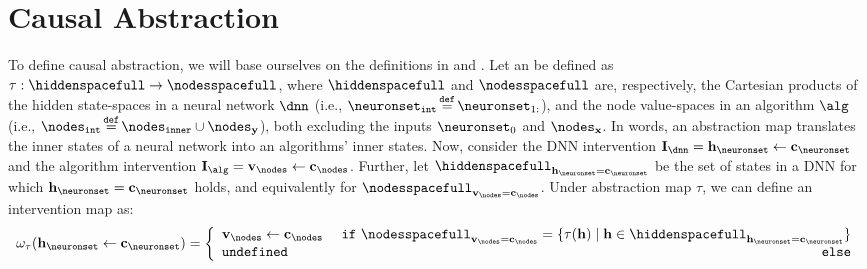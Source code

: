 \documentclass{article}
\newcommand{\bx}{\mathbf{x}}
\newcommand{\by}{\mathbf{y}}
\newcommand{\nodesvalues}{\mathbf{v}}
\newcommand{\nodesinput}{\nodes_{\bx}}
\newcommand{\nodesoutput}{\nodes_{\by}}
\newcommand{\nodesinner}{\nodes_{\mathtt{inner}}}
\newcommand{\hiddenstates}{\mathbf{h}}
\newcommand{\causalmap}{\phi}
\newcommand{\abstractionmap}{\tau}
\newcommand{\interventionmap}{\omega_{\abstractionmap}}
\begin{document}
\section{Causal Abstraction}
\label{sec:Causal_Abstraction}
\label{sec:causal_abstraction}

\newcommand{\nodesint}{\nodes_{\mathtt{int}}}
\newcommand{\neuronsetint}{\neuronset_{\mathtt{int}}}
\newcommand{\neuronsetintcausal}{\neuronset_{\mathtt{int}}^\causalmap}
\mycgmacro{\uselesspartition}{\!\bot}

To define causal abstraction, we will base ourselves on the definitions in \citet{Beckers2018AbstractingCM} and \citet{Geiger2023CausalAA}.
Let an  be defined as $\abstractionmap: \hiddenspacefull \to \nodesspacefull$, where $\hiddenspacefull$ and $\nodesspacefull$ are, respectively, the Cartesian products of the hidden state-spaces in a neural network $\dnn$ (i.e., $\neuronsetint \defeq \neuronset_{1:}$), and the node value-spaces  in an algorithm $\alg$ (i.e., $\nodesint \defeq \nodesinner\cup\nodesoutput$), both excluding the inputs $\neuronset_0$ and $\nodesinput$.
In words, an abstraction map translates the inner states of a neural network into an algorithms' inner states.
Now, consider the DNN intervention $\interventionsdnn = \hiddenstates_{\neuronset} \leftarrow \constants_{\neuronset}$ 
and the algorithm intervention $\interventionsalg = \nodesvalues_{\nodes} \leftarrow \constants_{\nodes}$. 
Further, let $\hiddenspacefull_{\hiddenstates_{\neuronset} = \constants_{\neuronset}}$ be the set of states 
in a DNN for which $\hiddenstates_{\neuronset} = \constants_{\neuronset}$ holds, and equivalently for $\nodesspacefull_{\nodesvalues_{\nodes} = \constants_{\nodes}}$.
Under abstraction map $\abstractionmap$, we can define an intervention map as:
\begin{align}\label{eq:interventionmap}
    \interventionmap(\hiddenstates_{\neuronset} \leftarrow \constants_{\neuronset}) = \left\{\begin{array}{lr}
         \nodesvalues_{\nodes} \leftarrow \constants_{\nodes} & 
         \,\,\mathtt{if}\,\, \nodesspacefull_{\nodesvalues_{\nodes} = \constants_{\nodes}} = \{\tau(\hiddenstates) \mid \hiddenstates \in \hiddenspacefull_{\hiddenstates_{\neuronset} = \constants_{\neuronset}}\} \\
         \mathtt{undefined} & \mathtt{else}
    \end{array}\right.
\end{align}
\end{document}
